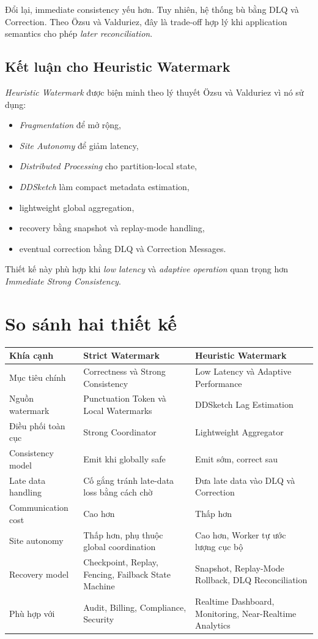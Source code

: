 \documentclass[12pt,a4paper]{article}
\begin{document}
Đổi lại, immediate consistency yếu hơn. Tuy nhiên, hệ thống bù bằng DLQ và Correction. Theo Özsu và Valduriez, đây là trade-off hợp lý khi application semantics cho phép \textit{later reconciliation}.

\subsection{Kết luận cho Heuristic Watermark}

\textit{Heuristic Watermark} được biện minh theo lý thuyết Özsu và Valduriez vì nó sử dụng:

\begin{itemize}
    \item \textit{Fragmentation} để mở rộng,
    \item \textit{Site Autonomy} để giảm latency,
    \item \textit{Distributed Processing} cho partition-local state,
    \item \textit{DDSketch} làm compact metadata estimation,
    \item lightweight global aggregation,
    \item recovery bằng snapshot và replay-mode handling,
    \item eventual correction bằng DLQ và Correction Messages.
\end{itemize}

Thiết kế này phù hợp khi \textit{low latency} và \textit{adaptive operation} quan trọng hơn \textit{Immediate Strong Consistency}.

\section{So sánh hai thiết kế}

\begin{longtable}{p{} p{} p{}}
\toprule
\textbf{Khía cạnh} & \textbf{Strict Watermark} & \textbf{Heuristic Watermark} \\
\midrule
\endhead
Mục tiêu chính & Correctness và Strong Consistency & Low Latency và Adaptive Performance \\
Nguồn watermark & Punctuation Token và Local Watermarks & DDSketch Lag Estimation \\
Điều phối toàn cục & Strong Coordinator & Lightweight Aggregator \\
Consistency model & Emit khi globally safe & Emit sớm, correct sau \\
Late data handling & Cố gắng tránh late-data loss bằng cách chờ & Đưa late data vào DLQ và Correction \\
Communication cost & Cao hơn & Thấp hơn \\
Site autonomy & Thấp hơn, phụ thuộc global coordination & Cao hơn, Worker tự ước lượng cục bộ \\
Recovery model & Checkpoint, Replay, Fencing, Failback State Machine & Snapshot, Replay-Mode Rollback, DLQ Reconciliation \\
Phù hợp với & Audit, Billing, Compliance, Security & Realtime Dashboard, Monitoring, Near-Realtime Analytics \\
\bottomrule
\end{longtable}
\end{document}
